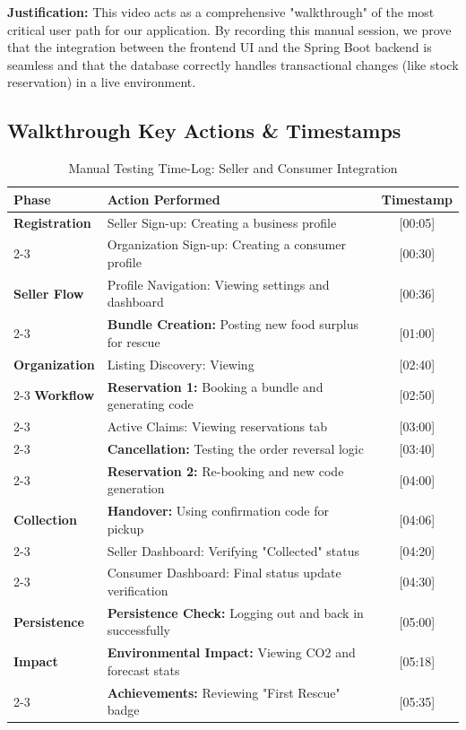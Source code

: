 \documentclass[12pt,a4paper]{article}
\begin{document}
\noindent \textbf{Justification:}
This video acts as a comprehensive "walkthrough" of the most critical user path for our application. By recording this manual session, we prove that the integration between the frontend UI and the Spring Boot backend is seamless and that the database correctly handles transactional changes (like stock reservation) in a live environment.

\subsection*{Walkthrough Key Actions \& Timestamps}
\begin{table}[H]
    \centering
    \small
    \renewcommand{\arraystretch}{1.2}
    \begin{tabular}{|l|p{8cm}|c|}
        \hline
        \rowcolor{gray!10} \textbf{Phase} & \textbf{Action Performed} & \textbf{Timestamp} \\ \hline
        \textbf{Registration} & Seller Sign-up: Creating a business profile & [00:05] \\ \cline{2-3}
        & Organization Sign-up: Creating a consumer profile & [00:30] \\ \hline
        \textbf{Seller Flow} & Profile Navigation: Viewing settings and dashboard & [00:36] \\ \cline{2-3}
        & \textbf{Bundle Creation:} Posting new food surplus for rescue & [01:00] \\ \hline
        \textbf{Organization} & Listing Discovery: Viewing & [02:40] \\ \cline{2-3}
        \textbf{Workflow} & \textbf{Reservation 1:} Booking a bundle and generating code & [02:50] \\ \cline{2-3}
        & Active Claims: Viewing reservations tab & [03:00] \\ \cline{2-3}
        & \textbf{Cancellation:} Testing the order reversal logic & [03:40] \\ \cline{2-3}
        & \textbf{Reservation 2:} Re-booking and new code generation & [04:00] \\ \hline
        \textbf{Collection} & \textbf{Handover:} Using confirmation code for pickup & [04:06] \\ \cline{2-3}
        & Seller Dashboard: Verifying "Collected" status & [04:20] \\ \cline{2-3}
        & Consumer Dashboard: Final status update verification & [04:30] \\ \hline
        \textbf{Persistence} & \textbf{Persistence Check:} Logging out and back in successfully & [05:00] \\ \hline
        \textbf{Impact} & \textbf{Environmental Impact:} Viewing CO2 and forecast stats & [05:18] \\ \cline{2-3}
        & \textbf{Achievements:} Reviewing "First Rescue" badge & [05:35] \\ \hline
    \end{tabular}
    \caption{Manual Testing Time-Log: Seller and Consumer Integration}
\end{table}
\end{document}

